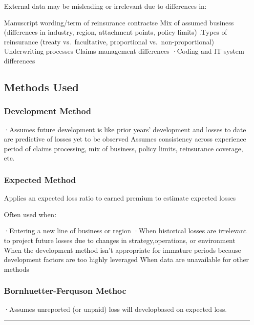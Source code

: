\documentclass[
]{article}
\begin{document}
External data may be misleading or irrelevant due to differences in:

Manuscript wording/term of reinsurance contractse Mix of assumed
business (differences in industry, region, attachment points, policy
limits) .Types of reinsurance (treaty vs.~facultative, proportional
vs.~non-proportional) Underwriting processes Claims management
differences ·Coding and IT system differences

\subsection{Methods Used}\label{methods-used}

\subsubsection{Development Method}\label{development-method}

·Assumes future development is like prior years' development and losses
to date are predictive of losses yet to be observed Assumes consistency
across experience period of claims processing, mix of business, policy
limits, reinsurance coverage, etc.

\subsubsection{Expected Method}\label{expected-method}

Applies an expected loss ratio to earned premium to estimate expected
losses

Often used when:

·Entering a new line of business or region ·When historical losses are
irrelevant to project future losses due to changes in
strategy,operations, or environment When the development method isn't
appropriate for immature periods because development factors are too
highly leveraged When data are unavailable for other methods

\subsubsection{Bornhuetter-Ferquson
Methoc}\label{bornhuetter-ferquson-methoc}

·Assumes unreported (or unpaid) loss will developbased on expected loss.

\begin{center}\rule{0.5\linewidth}{0.5pt}\end{center}
\end{document}
